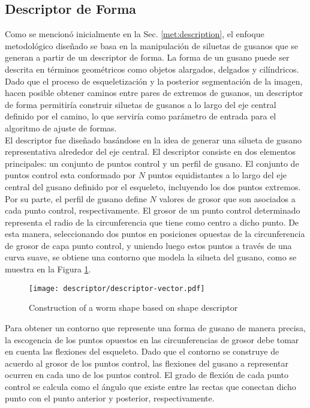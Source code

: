 \subsection{Descriptor de Forma}
\label{sec:metshapedescriptor}

Como se mencion\'o inicialmente en la Sec. \ref{met:description}, 
el enfoque metodol\'ogico dise\~nado se basa en la manipulaci\'on de 
siluetas de gusanos que se generan a partir de un descriptor de forma.
La forma de un gusano puede ser descrita en t\'erminos geom\'etricos
como objetos alargados, delgados y cil\'indricos. Dado que el proceso
de esqueletizaci\'on y la posterior segmentaci\'on de la imagen, hacen
posible obtener caminos entre pares de extremos de gusanos, un descriptor
de forma permitir\'ia construir siluetas de gusanos a lo largo del
eje central definido por el camino, lo que servir\'ia como par\'ametro
de entrada para el algoritmo de ajuste de formas.\\


El descriptor fue dise\~nado bas\'andose en la idea de generar una silueta
de gusano representativa alrededor del eje central. El descriptor consiste en
dos elementos principales: un conjunto de puntos control y un perfil de gusano.
El conjunto de puntos control esta conformado por $N$ puntos equidistantes a lo
largo del eje central del gusano definido por el esqueleto, incluyendo los
dos puntos extremos. Por su parte, el perfil de gusano define $N$ valores de 
grosor que son asociados a cada punto control, respectivamente. El grosor de
un punto control determinado representa el radio de la circunferencia que tiene
como centro a dicho punto. De esta manera, seleccionando dos puntos en posiciones
opuestas de la circunferencia de grosor de capa punto control, y uniendo luego estos
puntos a trav\'es de una curva suave, se obtiene una contorno
que modela la silueta del gusano, como se muestra en la Figura 
\ref{fig:descriptor}. 

\begin{figure}
 \centering
   \texttt{[image: descriptor/descriptor-vector.pdf]}
 \caption{Construction of a worm shape based on shape descriptor}
 \label{fig:descriptor}
\end{figure}

Para obtener un contorno que represente una forma de gusano de manera precisa,
la escogencia de los puntos opuestos en las circunferencias de grosor
debe tomar en cuenta las flexiones del esqueleto. Dado que el contorno se
construye de acuerdo al grosor de los puntos control, las flexiones del gusano
a representar ocurren en cada uno de los puntos control. El grado de flexi\'on
de cada punto control se calcula como el \'angulo que existe entre las rectas
que conectan dicho punto con el punto anterior y posterior, respectivamente.\\

